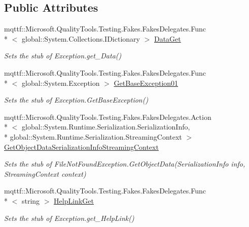 \subsection*{Public Attributes}
\begin{DoxyCompactItemize}
\item 
mqttf\-::\-Microsoft.\-Quality\-Tools.\-Testing.\-Fakes.\-Fakes\-Delegates.\-Func\\*
$<$ global\-::\-System.\-Collections.\-I\-Dictionary $>$ \hyperlink{class_system_1_1_i_o_1_1_fakes_1_1_stub_file_not_found_exception_a7e9205e5be482abdea2695087970a5b5}{Data\-Get}
\begin{DoxyCompactList}\small\item\em Sets the stub of Exception.\-get\-\_\-\-Data()\end{DoxyCompactList}\item 
mqttf\-::\-Microsoft.\-Quality\-Tools.\-Testing.\-Fakes.\-Fakes\-Delegates.\-Func\\*
$<$ global\-::\-System.\-Exception $>$ \hyperlink{class_system_1_1_i_o_1_1_fakes_1_1_stub_file_not_found_exception_a369fa846ea0ae44368657137106369ad}{Get\-Base\-Exception01}
\begin{DoxyCompactList}\small\item\em Sets the stub of Exception.\-Get\-Base\-Exception()\end{DoxyCompactList}\item 
mqttf\-::\-Microsoft.\-Quality\-Tools.\-Testing.\-Fakes.\-Fakes\-Delegates.\-Action\\*
$<$ global\-::\-System.\-Runtime.\-Serialization.\-Serialization\-Info, \\*
global\-::\-System.\-Runtime.\-Serialization.\-Streaming\-Context $>$ \hyperlink{class_system_1_1_i_o_1_1_fakes_1_1_stub_file_not_found_exception_ac4f62229721b20f1f5e85f786633f354}{Get\-Object\-Data\-Serialization\-Info\-Streaming\-Context}
\begin{DoxyCompactList}\small\item\em Sets the stub of File\-Not\-Found\-Exception.\-Get\-Object\-Data(\-Serialization\-Info info, Streaming\-Context context)\end{DoxyCompactList}\item 
mqttf\-::\-Microsoft.\-Quality\-Tools.\-Testing.\-Fakes.\-Fakes\-Delegates.\-Func\\*
$<$ string $>$ \hyperlink{class_system_1_1_i_o_1_1_fakes_1_1_stub_file_not_found_exception_a446d88be92522b881373e71ad1d4dac9}{Help\-Link\-Get}
\begin{DoxyCompactList}\small\item\em Sets the stub of Exception.\-get\-\_\-\-Help\-Link()\end{DoxyCompactList}\item 

\end{DoxyCompactItemize}
